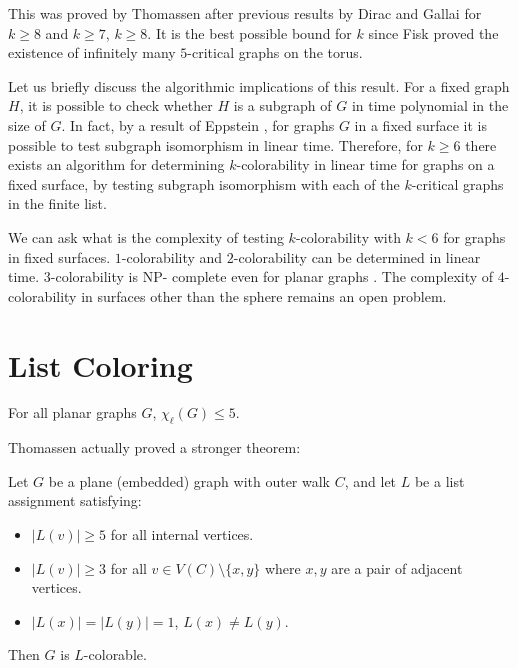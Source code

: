 This was proved by Thomassen after previous results by Dirac and Gallai for $k \geq 8$
and $k \geq 7$, $k \geq 8$. It is the best possible bound for $k$ since Fisk \cite{fisk} proved
the existence of infinitely many $5$-critical graphs on the torus.

Let us briefly discuss the algorithmic implications of this result. For a fixed graph $H$, it 
is possible to check whether $H$ is a subgraph of $G$ in time polynomial in the size of $G$.
In fact, by a result of Eppstein \cite{eppstein}, for graphs $G$ in a fixed surface
it is possible to test subgraph isomorphism in linear time. Therefore, for $k \geq 6$ there exists an algorithm for determining $k$-colorability in linear time for graphs on a fixed surface,
by testing subgraph isomorphism with each of the $k$-critical graphs in the finite list. 

We can ask what is the complexity of testing $k$-colorability with $k < 6$ for graphs in fixed 
surfaces.
$1$-colorability and $2$-colorability can be determined in linear time. $3$-colorability is NP-
complete even for planar graphs \cite{3colorabilitynpcomplete}. The complexity of $4$-colorability 
in surfaces other than the
sphere remains an open problem. 

\section{List Coloring}




\cite{thomassenplanargraphchoosable}

\begin{theorem}
\label{thomassentheorem}
For all planar graphs $G$, $\chi_{\ell}(G) \leq 5$.
\end{theorem}

Thomassen actually proved a stronger theorem: 

\begin{theorem}
\label{thomassenstrongertheorem}
	Let $G$ be a plane (embedded) graph with outer walk $C$, and let $L$ be a list assignment satisfying:
\begin{itemize}
	\item $|L(v)| \geq 5$ for all internal vertices.
	\item $|L(v)| \geq 3$ for all $v \in V(C) \setminus \{x, y\}$ where $x, y$ are a pair of adjacent vertices.
	\item $|L(x)| = |L(y)| = 1$, $L(x) \neq L(y)$. 
\end{itemize}	
	Then $G$ is $L$-colorable.
\end{theorem}

